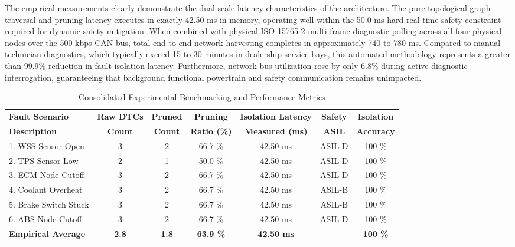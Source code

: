 \documentclass[11pt,a4paper]{article}
\begin{document}
The empirical measurements clearly demonstrate the dual-scale latency characteristics of the architecture. The pure topological graph traversal and pruning latency executes in exactly 42.50 ms in memory, operating well within the 50.0 ms hard real-time safety constraint required for dynamic safety mitigation. When combined with physical ISO 15765-2 multi-frame diagnostic polling across all four physical nodes over the 500 kbps CAN bus, total end-to-end network harvesting completes in approximately 740 to 780 ms. Compared to manual technician diagnostics, which typically exceed 15 to 30 minutes in dealership service bays, this automated methodology represents a greater than 99.9\% reduction in fault isolation latency. Furthermore, network bus utilization rose by only 6.8\% during active diagnostic interrogation, guaranteeing that background functional powertrain and safety communication remains unimpacted.

\begin{table}[H]
\centering
\caption{Consolidated Experimental Benchmarking and Performance Metrics}
\label{tab:benchmarking_consolidated}
\renewcommand{\arraystretch}{1.2}
\small
\begin{tabular}{p{3.4cm} c c c c c c}
\toprule
\textbf{Fault Scenario} & \textbf{Raw DTCs} & \textbf{Pruned} & \textbf{Pruning} & \textbf{Isolation Latency} & \textbf{Safety} & \textbf{Isolation} \\
\textbf{Description} & \textbf{Count} & \textbf{Count} & \textbf{Ratio (\%)} & \textbf{Measured (ms)} & \textbf{ASIL} & \textbf{Accuracy} \\
\midrule
1. WSS Sensor Open & 3 & 2 & 66.7 \% & 42.50 ms & ASIL-D & 100 \% \\
2. TPS Sensor Low & 2 & 1 & 50.0 \% & 42.50 ms & ASIL-D & 100 \% \\
3. ECM Node Cutoff & 3 & 2 & 66.7 \% & 42.50 ms & ASIL-D & 100 \% \\
4. Coolant Overheat & 3 & 2 & 66.7 \% & 42.50 ms & ASIL-B & 100 \% \\
5. Brake Switch Stuck & 3 & 2 & 66.7 \% & 42.50 ms & ASIL-B & 100 \% \\
6. ABS Node Cutoff & 3 & 2 & 66.7 \% & 42.50 ms & ASIL-D & 100 \% \\
\midrule
\textbf{Empirical Average} & \textbf{2.8} & \textbf{1.8} & \textbf{63.9 \%} & \textbf{42.50 ms} & \textbf{--} & \textbf{100 \%} \\
\bottomrule
\end{tabular}
\end{table}
\end{document}
